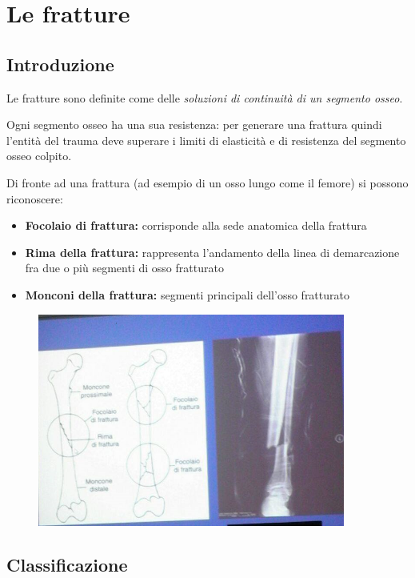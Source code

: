 \section{Le fratture}

\subsection{Introduzione}

Le fratture sono definite come delle \emph{soluzioni di continuità di un segmento osseo}.

Ogni segmento osseo ha una sua resistenza: per generare una frattura quindi l'entità del trauma deve superare i limiti di elasticità e di resistenza del segmento osseo colpito.

Di fronte ad una frattura (ad esempio di un osso lungo come il femore) si possono riconoscere:

\begin{itemize}
\item
  \textbf{Focolaio di frattura:} corrisponde alla sede anatomica della frattura
\item
  \textbf{Rima della frattura:} rappresenta l'andamento della linea di demarcazione fra due o più segmenti di osso fratturato
\item
  \textbf{Monconi della frattura:} segmenti principali dell'osso fratturato
\end{itemize}

\begin{figure}[!ht]
\centering
\includegraphics[width=0.9\textwidth]{002/image1.png}
\end{figure}


\subsection{Classificazione}

